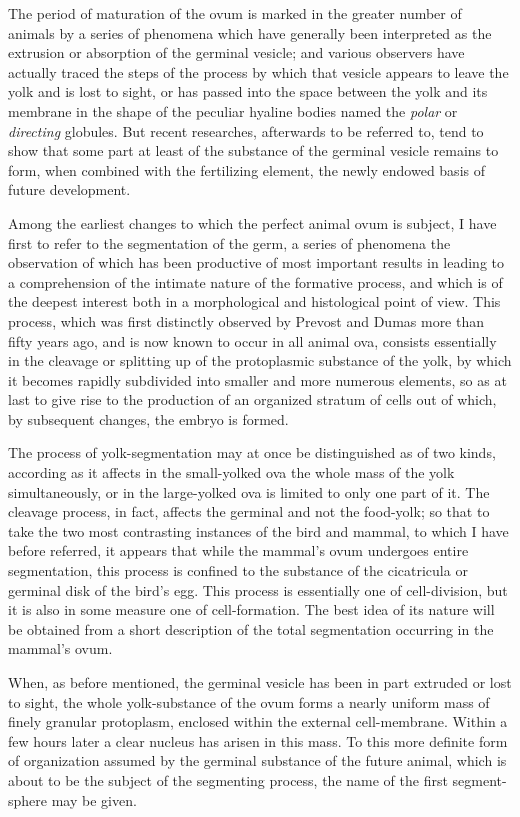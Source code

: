 \documentclass[a4paper, 11pt, oneside, english]{article}
\begin{document}
The period of maturation of the ovum is marked in the greater number of animals by a series of phenomena which have generally been interpreted as the extrusion or absorption of the germinal vesicle; and various observers have actually traced the steps of the process by which that vesicle appears to leave the yolk and is lost to sight, or has passed into the space between the yolk and its membrane in the shape of the peculiar hyaline bodies named the \emph{polar} or \emph{directing} globules. But recent researches, afterwards to be referred to, tend to show that some part at least of the substance of the germinal vesicle remains to form, when combined with the fertilizing element, the newly endowed basis of future development.

Among the earliest changes to which the perfect animal ovum is subject, I have first to refer to the segmentation of the germ, a series of phenomena the observation of which has been productive of most important results in leading to a comprehension of the intimate nature of the formative process, and which is of the deepest interest both in a morphological and histological point of view. This process, which was first distinctly observed by Prevost and Dumas more than fifty years ago, and is now known to occur in all animal ova, consists essentially in the cleavage or splitting up of the protoplasmic substance of the yolk, by which it becomes rapidly subdivided into smaller and more numerous elements, so as at last to give rise to the production of an organized stratum of cells out of which, by subsequent changes, the embryo is formed.

The process of yolk-segmentation may at once be distinguished as of two kinds, according as it affects in the small-yolked ova the whole mass of the yolk simultaneously, or in the large-yolked ova is limited to only one part of it. The cleavage process, in fact, affects the germinal and not the food-yolk; so that to take the two most contrasting instances of the bird and mammal, to which I have before referred, it appears that while the mammal's ovum undergoes entire segmentation, this process is confined to the substance of the cicatricula or germinal disk of the bird's egg. This process is essentially one of cell-division, but it is also in some measure one of cell-formation. The best idea of its nature will be obtained from a short description of the total segmentation occurring in the mammal's ovum.

When, as before mentioned, the germinal vesicle has been in part extruded or lost to sight, the whole yolk-substance of the ovum forms a nearly uniform mass of finely granular protoplasm, enclosed within the external cell-membrane. Within a few hours later a clear nucleus has arisen in this mass. To this more definite form of organization assumed by the germinal substance of the future animal, which is about to be the subject of the segmenting process, the name of the first segment-sphere may be given.
\end{document}
